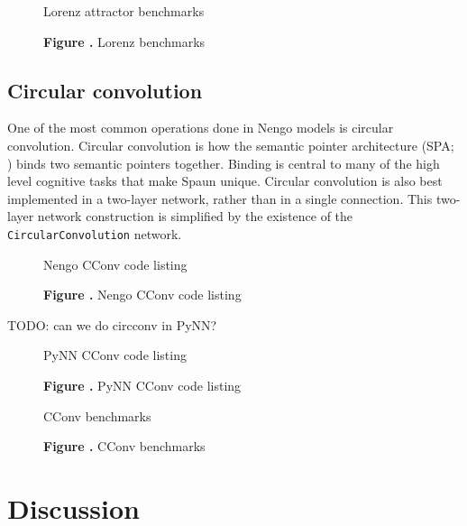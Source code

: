 \documentclass{frontiersSCNS}
\begin{document}
\begin{figure}
\begin{center}
  Lorenz attractor benchmarks
\end{center}
 \textbf{\label{fig:01} Figure .}{
   Lorenz benchmarks}
\end{figure}

\subsection{Circular convolution}

One of the most common operations done
in Nengo models is circular convolution.
Circular convolution is how
the semantic pointer architecture
(SPA; \cite{TODO})
binds two semantic pointers together.
Binding is central to many
of the high level cognitive tasks
that make Spaun unique.
Circular convolution
is also best implemented in a two-layer network,
rather than in a single connection.
This two-layer network construction is simplified
by the existence of the \texttt{CircularConvolution} network.

\begin{figure}
\begin{center}
  Nengo CConv code listing
\end{center}
 \textbf{\label{fig:01} Figure .}{
   Nengo CConv code listing}
\end{figure}

TODO: can we do circconv in PyNN?

\begin{figure}
\begin{center}
  PyNN CConv code listing
\end{center}
 \textbf{\label{fig:01} Figure .}{
   PyNN CConv code listing}
\end{figure}

\begin{figure}
\begin{center}
  CConv benchmarks
\end{center}
 \textbf{\label{fig:01} Figure .}{
   CConv benchmarks}
\end{figure}

\section{Discussion}
\end{document}
